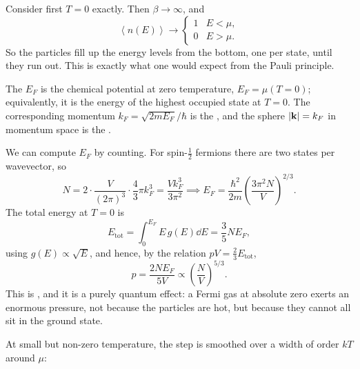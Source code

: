 \documentclass[a4paper]{scrartcl}
\newcommand{\avg}[1]{\left\langle #1 \right\rangle}
\begin{document}
Consider first $T = 0$ exactly. Then $\beta \to \infty$, and
$$
\avg{n(E)} \to \begin{cases}1 & E < \mu,\\ 0 & E > \mu.\end{cases}
$$
So the particles fill up the energy levels from the bottom, one per state, until they run out. This is exactly what one would expect from the Pauli principle.

\begin{definition}
	The  $E_F$ is the chemical potential at zero temperature, $E_F = \mu(T=0)$; equivalently, it is the energy of the highest occupied state at $T=0$. The corresponding momentum $k_F = \sqrt{2mE_F}/\hbar$ is the , and the sphere $|\mathbf{k}| = k_F$ in momentum space is the .
\end{definition}

We can compute $E_F$ by counting. For spin-$\tfrac 12$ fermions there are two states per wavevector, so
$$
N = 2\cdot\frac{V}{(2\pi)^3}\cdot\frac 43 \pi k_F^3 = \frac{Vk_F^3}{3\pi^2} \implies E_F = \frac{\hbar^2}{2m}\left(\frac{3\pi^2 N}{V}\right)^{2/3}.
$$
The total energy at $T=0$ is
$$
E_{\mathrm{tot}} = \int_0^{E_F}E\, g(E)\dd E = \frac 35 N E_F,
$$
using $g(E) \propto \sqrt E$, and hence, by the relation $pV = \tfrac 23 E_{\mathrm{tot}}$,
$$
p = \frac{2NE_F}{5V} \propto \left(\frac NV\right)^{5/3}.
$$
This is , and it is a purely quantum effect: a Fermi gas at absolute zero exerts an enormous pressure, not because the particles are hot, but because they cannot all sit in the ground state.

At small but non-zero temperature, the step is smoothed over a width of order $kT$ around $\mu$:
\end{document}
